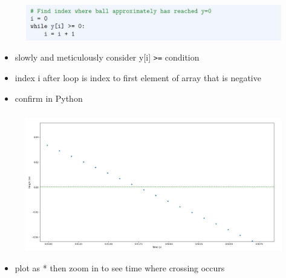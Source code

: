 \documentclass[english,14pt]{beamer}
\begin{document}

\begin{frame}[fragile]

\frametitle{}

\begin{figure}[ht]
	\centering
	\includegraphics[width=\textwidth]{figures/LLp65b}
\end{figure}

\begin{itemize}
	\item slowly and meticulously consider y[i] \verb+>=+  condition
	\item index i after loop is index to first element of array that is negative
	\item confirm in Python
\end{itemize}

\end{frame}


\begin{frame}[fragile]

\frametitle{}

\begin{figure}[ht]
	\centering
	\includegraphics[width=\textwidth]{figures/LLp66ZoomOutput}
\end{figure}

\begin{itemize}
	\item plot as * then zoom in to see time where crossing occurs
\end{itemize}

\end{frame}
\end{document}
